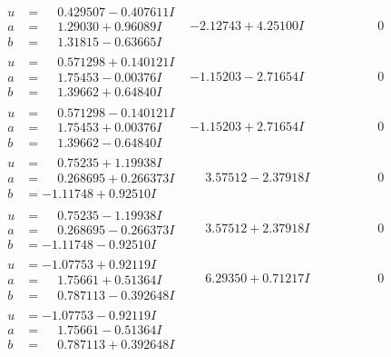 \documentclass[1p]{elsarticle_modified}
\theoremstyle{definition}
\begin{document}
$$\begin{array}{c|c|c}
\begin{aligned}
u &= \phantom{-}0.429507 - 0.407611 I \\
a &= \phantom{-}1.29030 + 0.96089 I \\
b &= \phantom{-}1.31815 - 0.63665 I\end{aligned}
 & -2.12743 + 4.25100 I & \phantom{-0.000000 } 0 \\ \hline\begin{aligned}
u &= \phantom{-}0.571298 + 0.140121 I \\
a &= \phantom{-}1.75453 - 0.00376 I \\
b &= \phantom{-}1.39662 + 0.64840 I\end{aligned}
 & -1.15203 - 2.71654 I & \phantom{-0.000000 } 0 \\ \hline\begin{aligned}
u &= \phantom{-}0.571298 - 0.140121 I \\
a &= \phantom{-}1.75453 + 0.00376 I \\
b &= \phantom{-}1.39662 - 0.64840 I\end{aligned}
 & -1.15203 + 2.71654 I & \phantom{-0.000000 } 0 \\ \hline\begin{aligned}
u &= \phantom{-}0.75235 + 1.19938 I \\
a &= \phantom{-}0.268695 + 0.266373 I \\
b &= -1.11748 + 0.92510 I\end{aligned}
 & \phantom{-}3.57512 - 2.37918 I & \phantom{-0.000000 } 0 \\ \hline\begin{aligned}
u &= \phantom{-}0.75235 - 1.19938 I \\
a &= \phantom{-}0.268695 - 0.266373 I \\
b &= -1.11748 - 0.92510 I\end{aligned}
 & \phantom{-}3.57512 + 2.37918 I & \phantom{-0.000000 } 0 \\ \hline\begin{aligned}
u &= -1.07753 + 0.92119 I \\
a &= \phantom{-}1.75661 + 0.51364 I \\
b &= \phantom{-}0.787113 - 0.392648 I\end{aligned}
 & \phantom{-}6.29350 + 0.71217 I & \phantom{-0.000000 } 0 \\ \hline\begin{aligned}
u &= -1.07753 - 0.92119 I \\
a &= \phantom{-}1.75661 - 0.51364 I \\
b &= \phantom{-}0.787113 + 0.392648 I\end{aligned}

\end{array}$$
\end{document}
